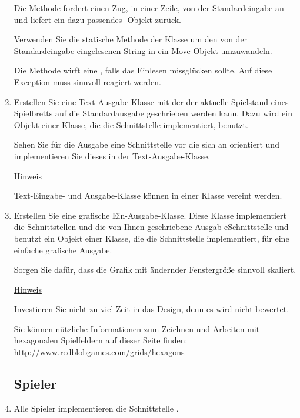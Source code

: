 \begin{enumerate}
Die Methode  fordert einen Zug, in einer Zeile, von der Standardeingabe an und liefert ein dazu passendes -Objekt zurück.

Verwenden Sie die statische Methode  der Klasse  um den von der Standardeingabe eingelesenen String in ein Move-Objekt umzuwandeln.

Die Methode  wirft eine , falls das Einlesen missglücken sollte. Auf diese Exception muss sinnvoll reagiert werden.

\item Erstellen Sie eine Text-Ausgabe-Klasse mit der der aktuelle Spielstand eines Spielbretts auf die Standardausgabe geschrieben werden kann. Dazu wird ein Objekt einer Klasse, die die Schnittstelle  implementiert, benutzt.

Sehen Sie für die Ausgabe eine Schnittstelle vor die sich an  orientiert und implementieren Sie dieses in der Text-Ausgabe-Klasse.

\underline{Hinweis}

Text-Eingabe- und Ausgabe-Klasse können in einer Klasse vereint werden.

\item Erstellen Sie eine grafische Ein-Ausgabe-Klasse. Diese Klasse implementiert die Schnittstellen  und die von Ihnen geschriebene Ausgab-eSchnittstelle und benutzt ein Objekt einer Klasse, die die Schnittstelle  implementiert, für eine einfache grafische Ausgabe.

Sorgen Sie dafür, dass die Grafik mit ändernder Fenstergröße sinnvoll skaliert.

\underline{Hinweis}

Investieren Sie nicht zu viel Zeit in das Design, denn es wird nicht bewertet.

Sie können nützliche Informationen zum Zeichnen und Arbeiten mit hexagonalen Spielfeldern auf dieser Seite finden: \href{http://www.redblobgames.com/grids/hexagons}{http://www.redblobgames.com/grids/hexagons}

\subsection*{Spieler}

\item Alle Spieler implementieren die Schnittstelle .


\end{enumerate}
